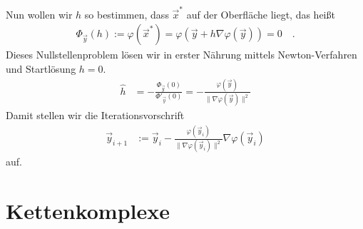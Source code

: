       Nun wollen wir \( h \) so bestimmen, dass \(\vec{x}^{*}\) auf der Oberfläche liegt, das heißt
      \begin{align}
        \Phi_{\vec{y}}(h) := \varphi(\vec{x}^{*}) = \varphi(\vec{y} +  h \nabla\varphi(\vec{y})) = 0 \quad\text{.}
      \end{align}
      Dieses Nullstellenproblem lösen wir in erster Nährung mittels Newton-Verfahren und Startlösung \( h=0 \).
      \begin{align}
        \hat{h} &= - \frac{\Phi_{\vec{y}}(0)}{\Phi'_{\vec{y}}(0)}
                = - \frac{\varphi(\vec{y})}{\|\nabla\varphi(\vec{y})\|^{2}}
      \end{align}
      Damit stellen wir die Iterationsvorschrift
      \begin{align}
        \vec{y}_{i+1} &:= \vec{y}_{i} - \frac{\varphi(\vec{y}_{i})}{\|\nabla\varphi(\vec{y}_{i})\|^{2}}  \nabla\varphi(\vec{y}_{i})
      \end{align}
      auf.


\section{Kettenkomplexe}
